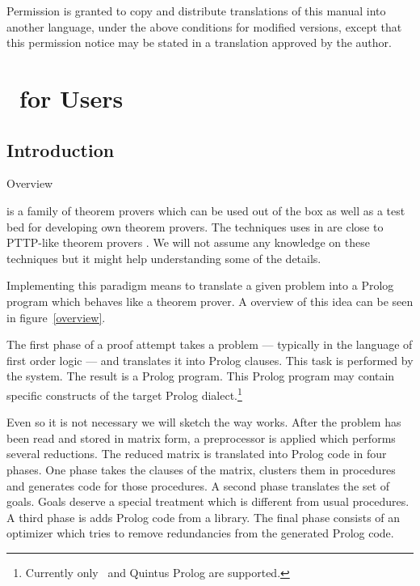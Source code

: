 Permission is granted to copy and  distribute translations of this manual into
another language, under  the  above conditions  for modified versions,  except
that this permission  notice may be stated  in a  translation approved by  the
author.


\tableofcontents

\part{\ProTop\ for Users}

\chapter*{Introduction}
\begin{floatingfigure}{.4\textwidth}
  \begin{center}
    \mbox{}
    \caption{Overview}\label{overview}
  \end{center}
\end{floatingfigure}

\ProCom{} is a family of theorem provers which can be used out of the box as
well as a test bed for developing own theorem provers. The techniques uses in
\ProCom{} are close to PTTP-like theorem provers \cite{stickel:prolog}. We
will not assume any knowledge on these techniques but it might help
understanding some of the details.

Implementing this paradigm means to translate a given problem into a Prolog
program which behaves like a theorem prover. A overview of this idea can be
seen in figure~\ref{overview}.

The first phase of a proof attempt takes a problem --- typically in the
language of first order logic --- and translates it into Prolog clauses. This
task is performed by the \ProCom{} system. The result is a Prolog program.
This Prolog program may contain specific constructs of the target Prolog
dialect.\footnote{Currently only \eclipse\ and Quintus Prolog are supported.}

Even so it is not necessary we will sketch the way \ProCom{} works.  After the
problem has been read and stored in matrix form, a preprocessor is applied
which performs several reductions. The reduced matrix is translated into
Prolog code in four phases. One phase takes the clauses of the matrix,
clusters them in procedures and generates code for those procedures. A second
phase translates the set of goals. Goals deserve a special treatment which is
different from usual procedures. A third phase is adds Prolog code from a
library. The final phase consists of an optimizer which tries to remove
redundancies from the generated Prolog code.

